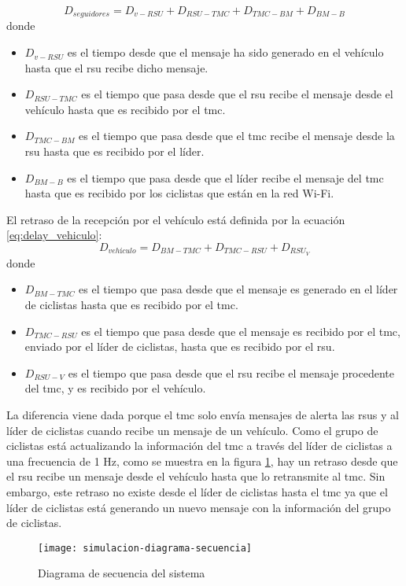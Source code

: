 \begin{equation}\label{eq:delay_seguidores}
D_{seguidores} = D_{v-RSU} + D_{RSU-TMC} + D_{TMC-BM} + D_{BM-B}
\end{equation}
donde
\begin{itemize}
	\item $D_{v-RSU}$ es el tiempo desde que el mensaje ha sido generado en el vehículo hasta que el \gls{rsu} recibe dicho mensaje.
	
	\item $D_{RSU-TMC}$ es el tiempo que pasa desde que el \gls{rsu} recibe el mensaje desde el vehículo hasta que es recibido por el \gls{tmc}.
	
	\item $D_{TMC-BM}$ es el tiempo que pasa desde que el \gls{tmc} recibe el mensaje desde la \gls{rsu} hasta que es recibido por el líder.
	
	\item $D_{BM-B}$ es el tiempo que pasa desde que el líder recibe el mensaje del \gls{tmc} hasta que es recibido por los ciclistas que están en la red Wi-Fi.
\end{itemize}
El retraso de la recepción por el vehículo está definida por la ecuación \ref{eq:delay_vehiculo}:
\begin{equation}\label{eq:delay_vehiculo}
D_{vehículo} = D_{BM-TMC} + D_{TMC-RSU} + D_{RSU_V}
\end{equation}
donde
\begin{itemize}
	\item $D_{BM-TMC}$ es el tiempo que pasa desde que el mensaje es generado en el líder de ciclistas hasta que es recibido por el \gls{tmc}.

	\item $D_{TMC-RSU}$ es el tiempo que pasa desde que el mensaje es recibido por el \gls{tmc}, enviado por el líder de ciclistas, hasta que es recibido por el \gls{rsu}.
	
	\item $D_{RSU-V}$ es el tiempo que pasa desde que el \gls{rsu} recibe el mensaje procedente del \gls{tmc}, y es recibido por el vehículo.
\end{itemize}

La diferencia viene dada porque el \gls{tmc} solo envía mensajes de alerta las \gls{rsu}s y al líder de ciclistas cuando recibe un mensaje de un vehículo. Como el grupo de ciclistas está actualizando la información del \gls{tmc} a través del líder de ciclistas a una frecuencia de 1 Hz, como se muestra en la figura \ref{fig:simulacion-diagrama-secuencia}, hay un retraso desde que el \gls{rsu} recibe un mensaje desde el vehículo hasta que lo retransmite al \gls{tmc}. Sin embargo, este retraso no existe desde el líder de ciclistas hasta el \gls{tmc} ya que el líder de ciclistas está generando un nuevo mensaje con la información del grupo de ciclistas.

\begin{figure}[t]
	\texttt{[image: simulacion-diagrama-secuencia]}
	\caption{Diagrama de secuencia del sistema}
	\label{fig:simulacion-diagrama-secuencia}
\end{figure}